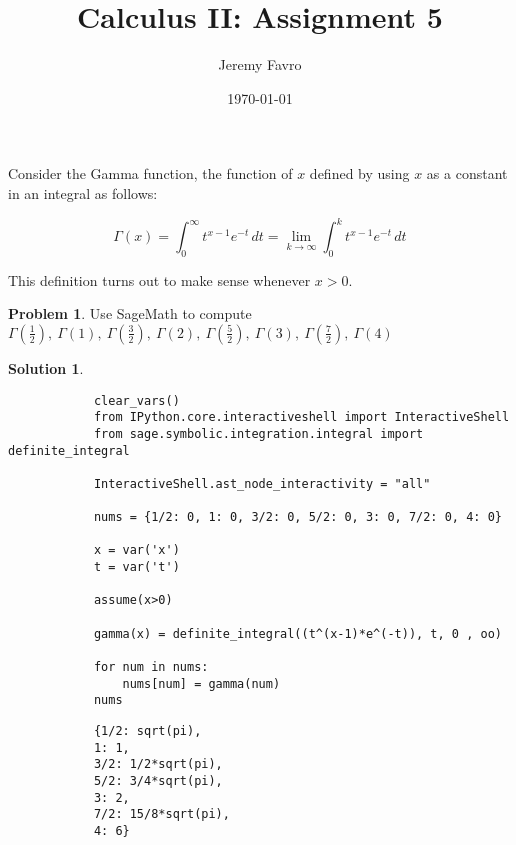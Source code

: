 \documentclass[10pt]{article}
\title{Calculus II: Assignment 5}
\author{Jeremy Favro}
\date{\today}
\makeatletter
\theoremstyle{definition}
\newtheorem{problem}{Problem}
\newtheorem{soln}{Solution}
\newcommand{\boxspacing}{\kern\kvtcb@left@rule\kern\kvtcb@boxsep}
\newcommand{\prompt}[4]{
    \ttfamily\llap{{\color{#2}[#3]:\hspace{3pt}#4}}\vspace{-\baselineskip}
}
\makeatother
\begin{document}
\maketitle

\noindent Consider the Gamma function, the function of $x$ defined by using $x$ as a constant in an integral
as follows:

$$\Gamma(x) = \int_{0}^{\infty} t^{x-1}e^{-t} \,dt = \lim_{k \to \infty} \int_{0}^{k} t^{x-1}e^{-t} \,dt$$

\noindent This definition turns out to make sense whenever $x>0$.

\begin{problem}
Use SageMath to compute $\Gamma\left(\frac{1}{2}\right), \: \Gamma\left(1\right), \: \Gamma\left(\frac{3}{2}\right), \: \Gamma\left(2\right), \: \Gamma\left(\frac{5}{2}\right),
    \: \Gamma\left(3\right), \: \Gamma\left(\frac{7}{2}\right), \: \Gamma\left(4\right)$
\end{problem}
\begin{soln} ~\\
    \begin{tcolorbox}[breakable, size=fbox, boxrule=1pt, pad at break*=1mm,colback=cellbackground, colframe=cellborder]
        \prompt{In}{incolor}{1}{\boxspacing}
        \begin{verbatim}
            clear_vars()
            from IPython.core.interactiveshell import InteractiveShell
            from sage.symbolic.integration.integral import definite_integral
            
            InteractiveShell.ast_node_interactivity = "all"
            
            nums = {1/2: 0, 1: 0, 3/2: 0, 5/2: 0, 3: 0, 7/2: 0, 4: 0}
            
            x = var('x')
            t = var('t')
            
            assume(x>0)
            
            gamma(x) = definite_integral((t^(x-1)*e^(-t)), t, 0 , oo)
            
            for num in nums:
                nums[num] = gamma(num)
            nums      
        \end{verbatim}
    \end{tcolorbox}
    \begin{tcolorbox}[breakable, size=fbox, boxrule=.5pt, pad at break*=1mm, opacityfill=0]
        \prompt{Out}{outcolor}{1}{\boxspacing}
        \begin{verbatim}
            {1/2: sqrt(pi),
            1: 1,
            3/2: 1/2*sqrt(pi),
            5/2: 3/4*sqrt(pi),
            3: 2,
            7/2: 15/8*sqrt(pi),
            4: 6}
        \end{verbatim}
    \end{tcolorbox}
\end{soln}
\end{document}
